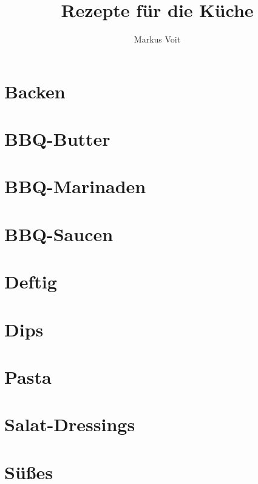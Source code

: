 \documentclass[
  DIV=11,%
  pagesize,%
  fontsize=11pt,%
  paper=a4,%
  numbers=noenddot,
]{scrartcl}
\title{Rezepte für die Küche}
\author{Markus Voit}
\begin{document}
\maketitle
\clearpage

\tableofcontents
\clearpage

\section{Backen}
\newpage
\newpage

\section{BBQ-Butter}
\newpage
\newpage
\newpage
\newpage
\newpage

\section{BBQ-Marinaden}
\newpage
\newpage
\newpage

\section{BBQ-Saucen}
\newpage
\newpage
\newpage
\newpage
\newpage
\newpage

\section{Deftig}
\newpage
\newpage

\section{Dips}
\newpage

\section{Pasta}
\newpage
\newpage

\section{Salat-Dressings}
\newpage

\section{Süßes}
\newpage
\newpage
\newpage
\end{document}
